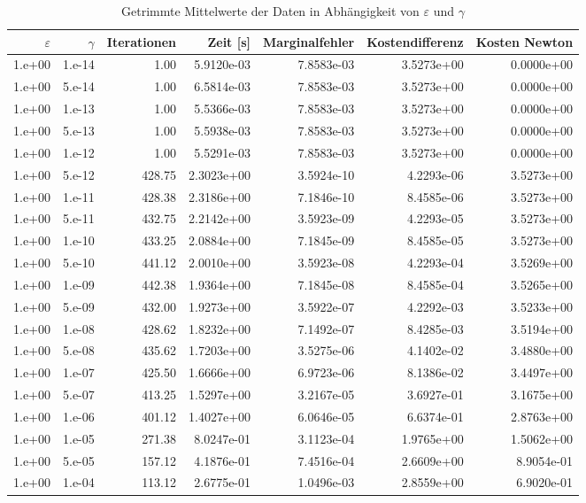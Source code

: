 \begin{table}[htbp]
\caption{Getrimmte Mittelwerte der Daten in Abhängigkeit von $\varepsilon$ und $\gamma$}
\label{tab:Parametertest256}
\small
\centering
{}
\begin{tabular}{rrrrrrr}
\toprule
$\varepsilon$ & $\gamma$ & Iterationen & Zeit [s] & Marginalfehler & Kostendifferenz & Kosten Newton \\
\midrule
1.e+00 & 1.e-14 & 1.00 & 5.9120e-03 & 7.8583e-03 & 3.5273e+00 & 0.0000e+00 \\
1.e+00 & 5.e-14 & 1.00 & 6.5814e-03 & 7.8583e-03 & 3.5273e+00 & 0.0000e+00 \\
1.e+00 & 1.e-13 & 1.00 & 5.5366e-03 & 7.8583e-03 & 3.5273e+00 & 0.0000e+00 \\
1.e+00 & 5.e-13 & 1.00 & 5.5938e-03 & 7.8583e-03 & 3.5273e+00 & 0.0000e+00 \\
1.e+00 & 1.e-12 & 1.00 & 5.5291e-03 & 7.8583e-03 & 3.5273e+00 & 0.0000e+00 \\
1.e+00 & 5.e-12 & 428.75 & 2.3023e+00 & 3.5924e-10 & 4.2293e-06 & 3.5273e+00 \\
1.e+00 & 1.e-11 & 428.38 & 2.3186e+00 & 7.1846e-10 & 8.4585e-06 & 3.5273e+00 \\
1.e+00 & 5.e-11 & 432.75 & 2.2142e+00 & 3.5923e-09 & 4.2293e-05 & 3.5273e+00 \\
1.e+00 & 1.e-10 & 433.25 & 2.0884e+00 & 7.1845e-09 & 8.4585e-05 & 3.5273e+00 \\
1.e+00 & 5.e-10 & 441.12 & 2.0010e+00 & 3.5923e-08 & 4.2293e-04 & 3.5269e+00 \\
1.e+00 & 1.e-09 & 442.38 & 1.9364e+00 & 7.1845e-08 & 8.4585e-04 & 3.5265e+00 \\
1.e+00 & 5.e-09 & 432.00 & 1.9273e+00 & 3.5922e-07 & 4.2292e-03 & 3.5233e+00 \\
1.e+00 & 1.e-08 & 428.62 & 1.8232e+00 & 7.1492e-07 & 8.4285e-03 & 3.5194e+00 \\
1.e+00 & 5.e-08 & 435.62 & 1.7203e+00 & 3.5275e-06 & 4.1402e-02 & 3.4880e+00 \\
1.e+00 & 1.e-07 & 425.50 & 1.6666e+00 & 6.9723e-06 & 8.1386e-02 & 3.4497e+00 \\
1.e+00 & 5.e-07 & 413.25 & 1.5297e+00 & 3.2167e-05 & 3.6927e-01 & 3.1675e+00 \\
1.e+00 & 1.e-06 & 401.12 & 1.4027e+00 & 6.0646e-05 & 6.6374e-01 & 2.8763e+00 \\
1.e+00 & 1.e-05 & 271.38 & 8.0247e-01 & 3.1123e-04 & 1.9765e+00 & 1.5062e+00 \\
1.e+00 & 5.e-05 & 157.12 & 4.1876e-01 & 7.4516e-04 & 2.6609e+00 & 8.9054e-01 \\
1.e+00 & 1.e-04 & 113.12 & 2.6775e-01 & 1.0496e-03 & 2.8559e+00 & 6.9020e-01 \\
\bottomrule
\end{tabular}
\end{table}

